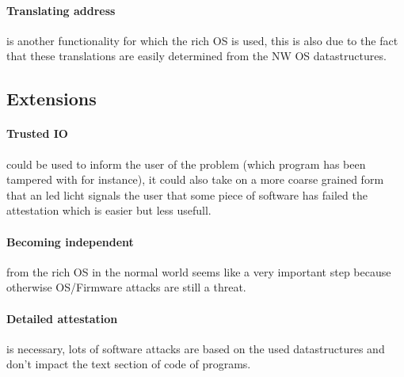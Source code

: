 \documentclass{report}
\begin{document}
\paragraph*{Translating address}
is another functionality for which the rich OS is used, this is also due to the fact that these translations are easily determined from the NW OS datastructures.

\subsection*{Extensions}

\paragraph*{Trusted IO}
could be used to inform the user of the problem (which program has been tampered with for instance), it could also take on a more coarse grained form that an led licht signals the user that some piece of software has failed the attestation which is easier but less usefull.

\paragraph*{Becoming independent}
from the rich OS in the normal world seems like a very important step because otherwise OS/Firmware attacks are still a threat.

\paragraph*{Detailed attestation}
is necessary, lots of software attacks are based on the used datastructures and don't impact the text section of code of programs.
\end{document}
